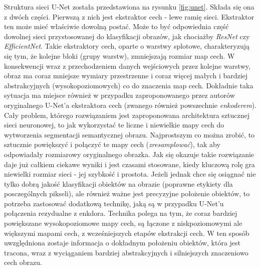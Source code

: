 \documentclass{classrep}
\begin{document}
{        %
        Struktura sieci U-Net została przedstawiona na rysunku \ref{fig:unet}. Składa się ona z dwóch
        części. Pierwszą z nich jest ekstraktor cech - lewe ramię sieci. Ekstraktor ten może mieć właściwie
        dowolną postać. Może to być odpowiednia część dowolnej sieci przystosowanej do klasyfikacji obrazów,
        jak chociażby \emph{ResNet} czy \emph{EfficientNet}. Takie ekstraktory cech, oparte o warstwy
        splotowe, charakteryzują się tym, że kolejne bloki (grupy warstw), zmniejszają rozmiar map cech. W
        konsekwencji wraz z przechodzeniem danych wejściowych przez kolejne warstwy, obraz ma coraz mniejsze
        wymiary przestrzenne i coraz więcej małych i bardziej abstrakcyjnych (wysokopoziomowych) co do
        znaczenia map cech. Dokładnie taka sytuacja ma miejsce również w przypadku zaproponowanego przez
        autorów oryginalnego U-Net'a ekstraktora cech (zwanego również powszechnie \emph{enkoderem}). Cały
        problem, którego rozwiązaniem jest zaproponowana architektura sztucznej sieci neuronowej, to jak
        wykorzystać te liczne i niewielkie mapy cech do wytworzenia segmentacji semantycznej obrazu.
        Najprostszym co można zrobić, to sztucznie powiększyć i połączyć te mapy cech (\emph{zresamplować}),
        tak aby odpowiadały rozmiarowy oryginalnego obrazka. Jak się okazuje takie rozwiązanie daje już
        całkiem ciekawe wyniki i jest czasami stosowane, kiedy kluczową rolę gra niewielki rozmiar sieci -
        jej szybkość i prostota. Jeżeli jednak chce się osiągnać nie tylko dobrą jakość klasyfikacji
        obiektów na obrazie (poprawne etykiety dla posczególnych pikseli), ale również ważne jest precyzyjne
        położenie obiektów, to potrzeba zastosować dodatkową technikę, jaką są w przypadku U-Net'u
        połączenia rezydualne z enkdora. Technika polega na tym, że coraz bardziej powiększane
        wysokopoziomowe mapy cech, są łączone z niskpoziomowymi ale większymi mapami cech, z wcześniejszych
        etapów ekstrakcji cech. W ten sposób uwzględniona zostaje informacja o dokładnym położeniu obiektów,
        która jest tracona, wraz z wyciąganiem bardziej abstrakcyjnych i silniejszych znaczeniowo cech
        obrazu.

}
\end{document}
